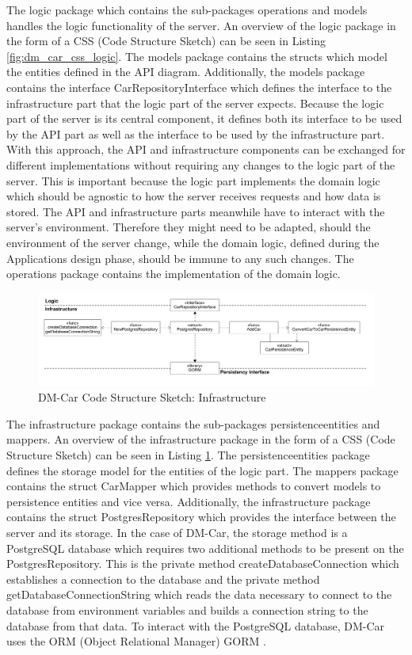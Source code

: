 The logic package which contains the sub-packages operations and models handles
the logic functionality of the server. An overview of the logic package in the form of a CSS (Code Structure Sketch)
can be seen in Listing \ref{fig:dm_car_css_logic}. The models package contains the structs
which model the entities defined in the API diagram. Additionally, the models
package contains the interface CarRepositoryInterface which defines the
interface to the infrastructure part that the logic part of the server expects.
Because the logic part of the server is its central component, it defines both
its interface to be used by the API part as well as the interface to be used by
the infrastructure part. With this approach, the API and infrastructure
components can be exchanged for different implementations without requiring any
changes to the logic part of the server. This is important because the logic
part implements the domain logic which should be agnostic to how the server
receives requests and how data is stored. The API and infrastructure parts
meanwhile have to interact with the server's environment. Therefore they might
need to be adapted, should the environment of the server change, while the
domain logic, defined during the Applications design phase, should be immune
to any such changes. The operations package contains the implementation of the
domain logic.

\begin{figure}[tb]
	\centering
	\includegraphics[width=\textwidth]{figures/8.9_dm_car_css_infrastructure.png}
	\caption{DM-Car Code Structure Sketch: Infrastructure}
	\label{fig:dm_car_css_infrastructure}
\end{figure}

The infrastructure package contains the sub-packages persistenceentities and mappers.
An overview of the infrastructure package in the form of a CSS (Code Structure Sketch)
can be seen in Listing \ref{fig:dm_car_css_infrastructure}. The
persistenceentities package defines the storage model for the entities of the logic part.
The mappers package contains the struct CarMapper which provides methods to convert
models to persistence entities and vice versa. Additionally, the infrastructure
package contains the struct PostgresRepository which provides the interface between
the server and its storage. In the case of DM-Car, the storage method is a
PostgreSQL \cite{POS-DOCS} database which requires two additional methods to
be present on the PostgresRepository. This is the private method createDatabaseConnection
which establishes a connection to the database and the private method getDatabaseConnectionString which
reads the data necessary to connect to the database from environment variables
and builds a connection string to the database from that data.
To interact with the PostgreSQL database, DM-Car uses the ORM (Object Relational Manager)
GORM \cite{Ji23}.

